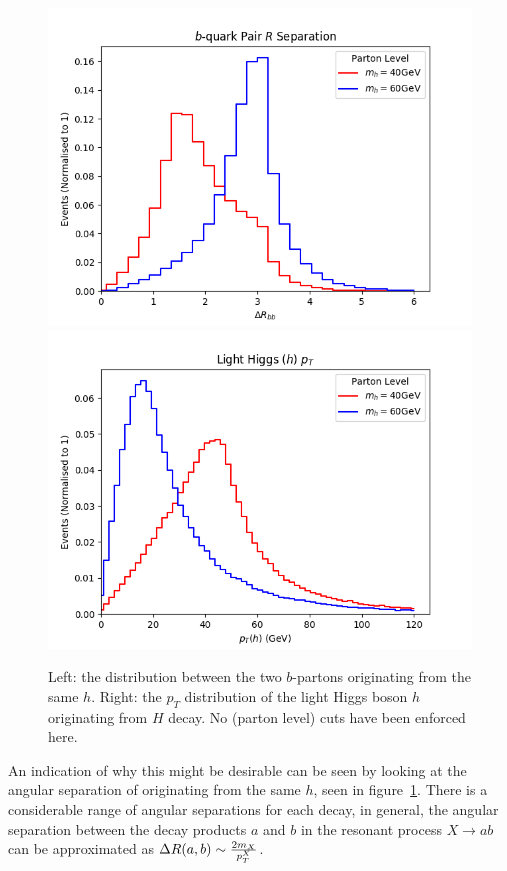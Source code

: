 \begin{figure}[htb!]
	\begin{center}
	\includegraphics[scale=0.42]{plots/parton/delRbb.png}
	\includegraphics[scale=0.42]{plots/parton/LHiggs_pt.png}
	 \end{center}
     \caption{Left: the \distancedeltar{} distribution between the
two $b$-partons originating from the same $h$.
Right: the $p_T$ distribution of the light Higgs boson $h$ originating from $H$ decay.
No (parton level) cuts have been enforced here. }
\label{fig:parton_higgs}
\end{figure}

An indication of why this might be desirable can be seen by
looking at the angular separation of  originating from the 
same \(h\), seen in figure~\ref{fig:parton_higgs}.
There is a considerable range of angular separations for each decay,
in general, the angular separation between the decay products $a$ and $b$  in the resonant process
$X \to a b$ can be approximated as $\Delta R{} (a,b) \sim \frac{2 m_{X}}{p^{X}_T}$.

